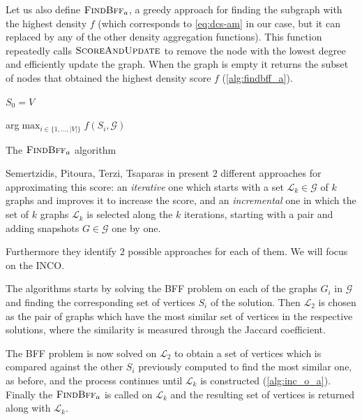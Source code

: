 Let us also define $\textsc{FindBff}_{a} $, a greedy approach for finding
the subgraph with the highest density $f$ (which corresponds to
\autoref{eq:dcs-am} in our case, but it can replaced by any of the other
density aggregation functions). This function repeatedly calls
$\textsc{ScoreAndUpdate}$ to remove the node with the lowest degree and efficiently update
the graph. When the graph is empty it returns the subset of nodes
that obtained the highest density score $f$ (\autoref{alg:findbff_a}).

\begin{algorithm}
	\SetAlgoLined
	$S_{0} = V$ \;


	\Return arg$\max _{i \in \{ 1, \dots, |V|\}} f(S_{i}, \mathcal{G})  $
	\caption{The $\textsc{FindBff}_{a} $ algorithm}
	\label{alg:findbff_a}
\end{algorithm}

Semertzidis, Pitoura, Terzi, Tsaparas in \cite{semertzidis2019finding} present
$2$ different approaches for approximating this score: an \emph{iterative} one
which starts with a set $\mathcal{L} _{k} \in \mathcal{G} $ of $k$ graphs and improves it to
increase the score, and an \emph{incremental} one in which the set of $k$
graphs $\mathcal{L}_{k} $ is selected along the $k$ iterations, starting with a
pair and adding snapshots $G \in \mathcal{G} $ one by one.

Furthermore they identify $2$ possible approaches for each of them. We will
focus on the \acrfull{INCO}.

The algorithms starts by solving the \acrshort{BFF} problem on each of the
graphs $G_{i} $ in $\mathcal{G} $ and finding the corresponding set of vertices
$S_{i} $ of the solution. Then $\mathcal{L}_{2}  $ is chosen as the pair of graphs which
have the most similar set of vertices in the respective solutions, where the
similarity is measured through the Jaccard coefficient.

The \acrshort{BFF} problem is now solved on $\mathcal{L} _{2} $ to obtain a set
of vertices which is compared against the other $S_i$ previously computed to
find the most similar one, as before, and the process continues until
$\mathcal{L}_{k} $ is constructed (\autoref{alg:inc_o_a}). Finally the
$\textsc{FindBff}_{a} $ is called on $\mathcal{L}_{k}  $ and the resulting set of
vertices is returned along with $\mathcal{L}_{k}  $.

